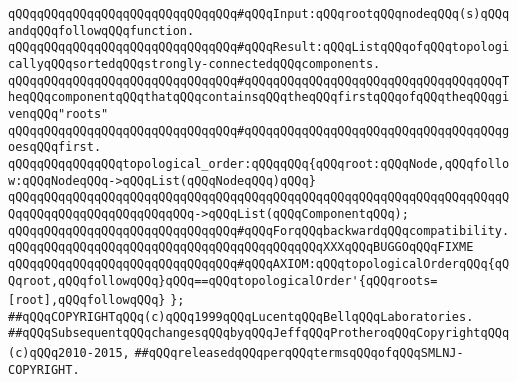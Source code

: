 \verb|qQQqqQQqqQQqqQQqqQQqqQQqqQQqqQQq#qQQqInput:qQQqrootqQQqnodeqQQq(s)qQQqandqQQqfollowqQQqfunction.|\newline
\verb|qQQqqQQqqQQqqQQqqQQqqQQqqQQqqQQq#qQQqResult:qQQqListqQQqofqQQqtopologicallyqQQqsortedqQQqstrongly-connectedqQQqcomponents.|\newline
\verb|qQQqqQQqqQQqqQQqqQQqqQQqqQQqqQQq#qQQqqQQqqQQqqQQqqQQqqQQqqQQqqQQqqQQqTheqQQqcomponentqQQqthatqQQqcontainsqQQqtheqQQqfirstqQQqofqQQqtheqQQqgivenqQQq"roots"|\newline
\verb|qQQqqQQqqQQqqQQqqQQqqQQqqQQqqQQq#qQQqqQQqqQQqqQQqqQQqqQQqqQQqqQQqqQQqgoesqQQqfirst.|\newline
\newline
\newline
\verb|qQQqqQQqqQQqqQQqtopological_order:qQQqqQQq{qQQqroot:qQQqNode,qQQqfollow:qQQqNodeqQQq->qQQqList(qQQqNodeqQQq)qQQq}|\newline
\verb|qQQqqQQqqQQqqQQqqQQqqQQqqQQqqQQqqQQqqQQqqQQqqQQqqQQqqQQqqQQqqQQqqQQqqQQqqQQqqQQqqQQqqQQqqQQqqQQq->qQQqList(qQQqComponentqQQq);|\newline
\newline
\verb|qQQqqQQqqQQqqQQqqQQqqQQqqQQqqQQq#qQQqForqQQqbackwardqQQqcompatibility.qQQqqQQqqQQqqQQqqQQqqQQqqQQqqQQqqQQqqQQqqQQqXXXqQQqBUGGOqQQqFIXME|\newline
\verb|qQQqqQQqqQQqqQQqqQQqqQQqqQQqqQQq#qQQqAXIOM:qQQqtopologicalOrderqQQq{qQQqroot,qQQqfollowqQQq}qQQq==qQQqtopologicalOrder'{qQQqroots=[root],qQQqfollowqQQq}|\newline
\newline
\newline
\verb|};|\newline
\newline
\newline
\verb|##qQQqCOPYRIGHTqQQq(c)qQQq1999qQQqLucentqQQqBellqQQqLaboratories.|\newline
\verb|##qQQqSubsequentqQQqchangesqQQqbyqQQqJeffqQQqProtheroqQQqCopyrightqQQq(c)qQQq2010-2015,|\newline
\verb|##qQQqreleasedqQQqperqQQqtermsqQQqofqQQqSMLNJ-COPYRIGHT.|\newline

